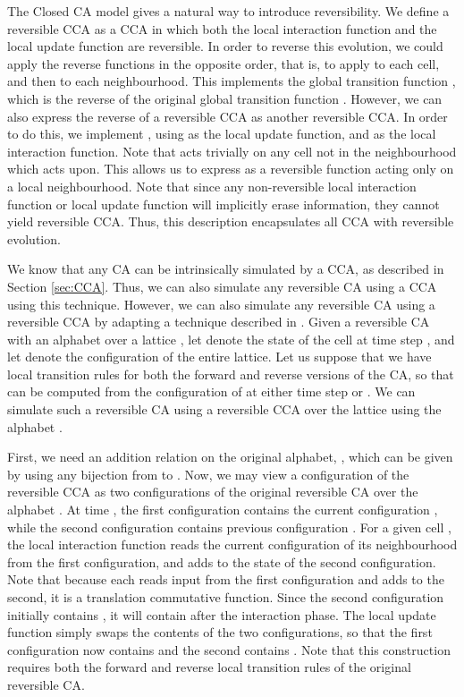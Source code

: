 \documentclass{jca}
\begin{document}
The Closed CA model gives a natural way to introduce reversibility.
We define a reversible CCA as a CCA in which both the local interaction function  and the local update function  are reversible.
In order to reverse this evolution, we could apply the reverse functions in the opposite order, that is, to apply  to each cell, and then  to each neighbourhood.
This implements the global transition function , which is the reverse of the original global transition function .
However, we can also express the reverse of a reversible CCA as another reversible CCA.
In order to do this, we implement , using  as the local update function, and  as the local interaction function.
Note that  acts trivially on any cell not in the neighbourhood which  acts upon.
This allows us to express  as a reversible function acting only on a local neighbourhood.
Note that since any non-reversible local interaction function  or local update function  will implicitly erase information, they cannot yield reversible CCA.
Thus, this description encapsulates all CCA with reversible evolution.

We know that any CA can be intrinsically simulated by a CCA, as described in Section \ref{sec:CCA}.
Thus, we can also simulate any reversible CA using a CCA using this technique.
However, we can also simulate any reversible CA using a reversible CCA by adapting a technique described in \cite{cabook}.
Given a reversible CA with an alphabet  over a lattice , let  denote the state of the cell  at time step , and let  denote the configuration of the entire lattice.
Let us suppose that we have local transition rules for both the forward and reverse versions of the CA, so that  can be computed from the configuration of  at either time step  or .
We can simulate such a reversible CA using a reversible CCA over the lattice  using the alphabet .

First, we need an addition relation on the original alphabet, , which can be given by using any bijection from  to .
Now, we may view a configuration of the reversible CCA as two configurations of the original reversible CA over the alphabet .
At time , the first configuration contains the current configuration , while the second configuration contains previous configuration .
For a given cell , the local interaction function  reads the current configuration of its neighbourhood from the first configuration, and adds  to the state of the second configuration.
Note that because each  reads input from the first configuration and adds to the second, it is a translation commutative function.
Since the second configuration initially contains , it will contain  after the interaction phase.
The local update function simply swaps the contents of the two configurations, so that the first configuration now contains  and the second contains .
Note that this construction requires both the forward and reverse local transition rules of the original reversible CA.
\end{document}
